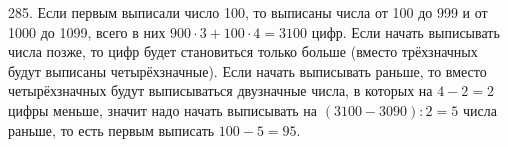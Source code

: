 285. Если первым выписали число 100, то выписаны числа от 100 до 999 и от 1000 до 1099, всего в них $900\cdot3+100\cdot4=3100$ цифр. Если начать выписывать числа позже, то цифр будет становиться только больше (вместо трёхзначных будут выписаны четырёхзначные). Если начать выписывать раньше, то вместо четырёхзначных будут выписываться двузначные числа, в которых на $4-2=2$ цифры меньше, значит надо начать выписывать на $(3100-3090):2=5$ числа раньше, то есть первым выписать $100-5=95.$\\
